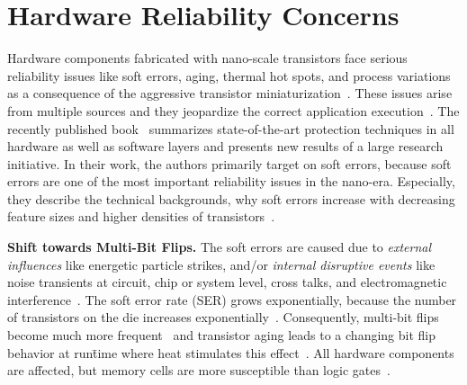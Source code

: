 \section{Hardware Reliability Concerns}
\label{sec:ProblemEvidence}

Hardware components fabricated with nano-scale transistors face serious reliability issues like soft errors, aging, thermal hot spots, and process variations as a consequence of the aggressive transistor miniaturization~\cite{DBLP:books/daglib/0037372}. These issues arise from multiple sources and they jeopardize the correct application execution~\cite{DBLP:books/daglib/0037372}. The recently published book~\cite{DBLP:books/daglib/0037372} summarizes state-of-the-art protection techniques in all hardware as well as software layers and presents new results of a large research initiative. In their work, the authors primarily target on soft errors, because soft errors are one of the most important reliability issues in the nano-era. Especially, they describe the technical backgrounds, why soft errors increase with decreasing feature sizes and higher densities of transistors~\cite{DBLP:books/daglib/0037372}.

\textbf{Shift towards Multi-Bit Flips.}
The soft errors are caused due to \emph{external influences} like energetic particle strikes, and/or \emph{internal disruptive events} like noise transients at circuit, chip or system level, cross talks, and electromagnetic interference~\cite{DBLP:books/daglib/0037372}. The soft error rate (SER) grows exponentially, because the number of transistors on the die increases exponentially~\cite{ibe2010impact,DBLP:books/daglib/0037372}. Consequently, multi-bit flips become much more frequent~\cite{DBLP:journals/micro/Borkar05,DBLP:conf/dac/HenkelBDGNSTW13,DBLP:books/daglib/0037372} and transistor aging leads to a changing bit flip behavior at run\=time where heat stimulates this effect~\cite{DBLP:conf/dac/HenkelBDGNSTW13}. All hardware components are affected, but memory cells are more susceptible than logic gates~\cite{DBLP:conf/dac/HenkelBDGNSTW13,DBLP:conf/asplos/HwangSS12,Kim:2007:MET:1331699.1331719}. 

